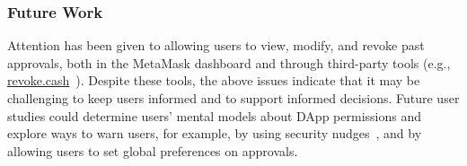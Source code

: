 \documentclass[conference]{IEEEtran}
\begin{document}
\subsubsection*{\textbf{Future Work}}
Attention has been given to allowing users to view, modify, and revoke past approvals, both in the MetaMask dashboard and through third-party tools (e.g., \url{revoke.cash}~\cite{revokeCash}). 
Despite these tools, the above issues indicate that it may be challenging to keep users informed and to support informed decisions. 
Future user studies could determine users' mental models about DApp permissions and explore ways to warn users, for example, by using security nudges~\cite{acquisti2017nudges}, and by allowing users to set global preferences on approvals.



\end{document}
